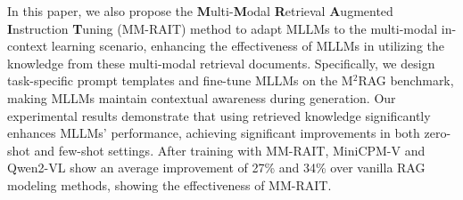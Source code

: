 In this paper, we also propose the \textbf{M}ulti-\textbf{M}odal \textbf{R}etrieval \textbf{A}ugmented \textbf{I}nstruction \textbf{T}uning (MM-RAIT) method to adapt MLLMs to the multi-modal in-context learning scenario, enhancing the effectiveness of MLLMs in utilizing the knowledge from these multi-modal retrieval documents. Specifically, we design task-specific prompt templates and fine-tune MLLMs on the M$^2$RAG benchmark, making MLLMs maintain contextual awareness during generation. Our experimental results demonstrate that using retrieved knowledge significantly enhances MLLMs' performance, achieving significant improvements in both zero-shot and few-shot settings. After training with MM-RAIT, MiniCPM-V and Qwen2-VL show an average improvement of 27\% and 34\% over vanilla RAG modeling methods, showing the effectiveness of MM-RAIT.

